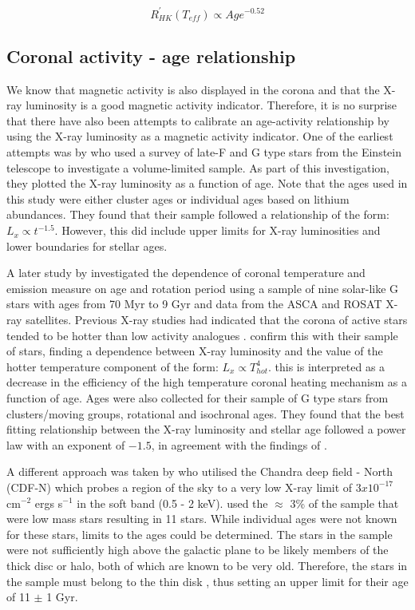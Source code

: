\begin{equation}
    R^{'}_{HK}(T_{eff}) \propto Age^{-0.52}
    \label{Eq:LO_etal_18_law}
\end{equation}

\subsection{Coronal activity - age relationship}
\label{hist_xray_age_section}
We know that magnetic activity is also displayed in the corona and that the X-ray luminosity is a good magnetic activity indicator. Therefore, it is no surprise that there have also been attempts to calibrate an age-activity relationship by using the X-ray luminosity as a magnetic activity indicator. One of the earliest attempts was by \citet{Maggio_etal_1987} who used a survey of late-F and G type stars from the Einstein telescope to investigate a volume-limited sample. As part of this investigation, they plotted the X-ray luminosity as a function of age. Note that the ages used in this study were either cluster ages or individual ages based on lithium abundances. They found that their sample followed a relationship of the form: $L_{x} \propto t^{-1.5}$. However, this did include upper limits for X-ray luminosities and lower boundaries for stellar ages.

A later study by \citet{Gudel_etal_1997} investigated the dependence of coronal temperature and emission measure on age and rotation period using a sample of nine solar-like G stars with ages from 70 Myr to 9 Gyr and data from the ASCA and ROSAT X-ray satellites. Previous X-ray studies had indicated that the corona of active stars tended to be hotter than low activity analogues \citep{Schmitt_etal_1995}. \citet{Gudel_etal_1997} confirm this with their sample of stars, finding a dependence between X-ray luminosity and the value of the hotter temperature component of the form: $L_{x} \propto T_{hot}^{4}$. this is interpreted as a decrease in the efficiency of the high temperature coronal heating mechanism as a function of age. Ages were also collected for their sample of G type stars from clusters/moving groups, rotational and isochronal ages. They found that the best fitting relationship between the X-ray luminosity and stellar age followed a power law with an exponent of $-1.5$, in agreement with the findings of \citet{Maggio_etal_1987}.

A different approach was taken by \citet{Feigelson_etal_2004} who utilised the Chandra deep field - North (CDF-N) which probes a region of the sky to a very low X-ray limit of $3 x 10^{-17}$ cm$^{-2}$ ergs s$^{-1}$ in the soft band (0.5 - 2 keV). \citet{Feigelson_etal_2004} used the $\approx$ 3\% of the sample that were low mass stars resulting in 11 stars. While individual ages were not known for these stars, limits to the ages could be determined. The stars in the sample were not sufficiently high above the galactic plane to be likely members of the thick disc or halo, both of which are known to be very old. Therefore, the stars in the sample must belong to the thin disk , thus setting an upper limit for their age of 11 $\pm$ 1 Gyr.

